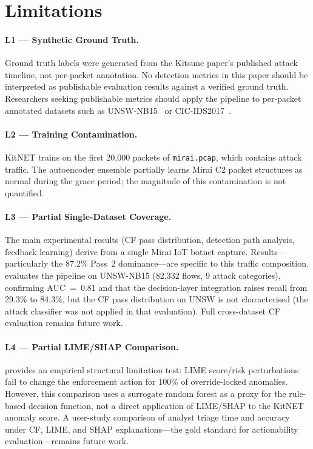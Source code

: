 \documentclass[preprint,12pt,authoryear]{elsarticle}
\begin{document}
\section{Limitations}
\label{sec:limitations}

\paragraph{L1 --- Synthetic Ground Truth.}
Ground truth labels were generated from the Kitsune paper's published attack
timeline, not per-packet annotation. No detection metrics in this paper should
be interpreted as publishable evaluation results against a verified ground truth.
Researchers seeking publishable metrics should apply the pipeline to per-packet
annotated datasets such as UNSW-NB15~\citep{Moustafa2015} or
CIC-IDS2017~\citep{Sharafaldin2018}.

\paragraph{L2 --- Training Contamination.}
KitNET trains on the first 20{,}000 packets of \texttt{mirai.pcap}, which
contains attack traffic. The autoencoder ensemble partially learns Mirai C2
packet structures as normal during the grace period; the magnitude of this
contamination is not quantified.

\paragraph{L3 --- Partial Single-Dataset Coverage.}
The main experimental results (CF pass distribution, detection path analysis,
feedback learning) derive from a single Mirai IoT botnet capture.
Results---particularly the 87.2\% Pass~2 dominance---are specific to this
traffic composition.  evaluates the pipeline on UNSW-NB15
(82{,}332 flows, 9 attack categories), confirming AUC~=~0.81 and that the
decision-layer integration raises recall from 29.3\% to 84.3\%, but the CF
pass distribution on UNSW is not characterised (the attack classifier was not
applied in that evaluation). Full cross-dataset CF evaluation remains future
work.

\paragraph{L4 --- Partial LIME/SHAP Comparison.}
 provides an empirical structural limitation test:
LIME score/risk perturbations fail to change the enforcement action for 100\%
of override-locked anomalies. However, this comparison uses a surrogate random
forest as a proxy for the rule-based decision function, not a direct application
of LIME/SHAP to the KitNET anomaly score. A user-study comparison of analyst
triage time and accuracy under CF, LIME, and SHAP explanations---the gold standard
for actionability evaluation---remains future work.
\end{document}
